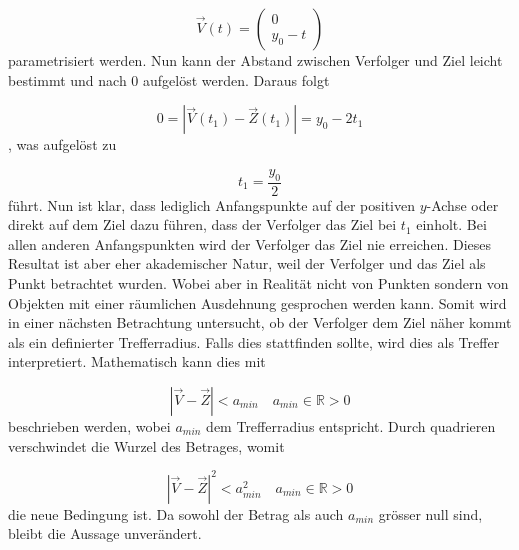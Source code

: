 \begin{equation}
    \vec{V}(t)
    =
    \left( \begin{array}{c} 0 \\ y_0-t \end{array} \right)
\end{equation}
%
parametrisiert werden.
Nun kann der Abstand zwischen Verfolger und Ziel leicht bestimmt und nach 0 aufgelöst werden.
Daraus folgt

\begin{equation}
    0
    =
    |\vec{V}(t_1)-\vec{Z}(t_1)|
    =
    y_0-2t_1
\end{equation}
%
, was aufgelöst zu

\begin{equation}
    t_1
    =
    \frac{y_0}{2}
\end{equation}
%
führt.
Nun ist klar, dass lediglich Anfangspunkte auf der positiven $y$-Achse oder direkt auf dem Ziel dazu führen, dass der Verfolger das Ziel bei $t_1$ einholt.
Bei allen anderen Anfangspunkten wird der Verfolger das Ziel nie erreichen.
Dieses Resultat ist aber eher akademischer Natur, weil der Verfolger und das Ziel als Punkt betrachtet wurden.
Wobei aber in Realität nicht von Punkten sondern von Objekten mit einer räumlichen Ausdehnung gesprochen werden kann.
Somit wird in einer nächsten Betrachtung untersucht, ob der Verfolger dem Ziel näher kommt als ein definierter Trefferradius.
Falls dies stattfinden sollte, wird dies als Treffer interpretiert.
Mathematisch kann dies mit

\begin{equation}
    |\vec{V}-\vec{Z}|<a_{min} \quad a_{min}\in\mathbb{R}>0
\end{equation}
%
beschrieben werden, wobei $a_{min}$ dem Trefferradius entspricht.
Durch quadrieren verschwindet die Wurzel des Betrages, womit

\begin{equation}
    |\vec{V}-\vec{Z}|^2<a_{min}^2 \quad a_{min}\in \mathbb{R} > 0
\end{equation}
%
die neue Bedingung ist.
Da sowohl der Betrag als auch $a_{min}$ grösser null sind, bleibt die Aussage unverändert.





